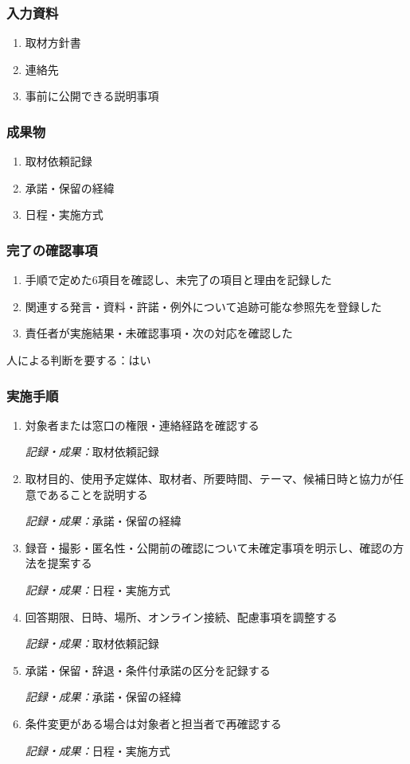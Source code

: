 \documentclass[a4paper,11pt]{article}
\begin{document}
\subsubsection*{入力資料}
\begin{enumerate}[leftmargin=2em,itemsep=0.35em]
\item 取材方針書
\item 連絡先
\item 事前に公開できる説明事項
\end{enumerate}
\subsubsection*{成果物}
\begin{enumerate}[leftmargin=2em,itemsep=0.35em]
\item 取材依頼記録
\item 承諾・保留の経緯
\item 日程・実施方式
\end{enumerate}
\subsubsection*{完了の確認事項}
\begin{enumerate}[leftmargin=2em,itemsep=0.35em]
\item 手順で定めた6項目を確認し、未完了の項目と理由を記録した
\item 関連する発言・資料・許諾・例外について追跡可能な参照先を登録した
\item 責任者が実施結果・未確認事項・次の対応を確認した
\end{enumerate}
\par 人による判断を要する：はい\par\medskip
\subsubsection*{実施手順}
\begin{enumerate}[leftmargin=2em,itemsep=0.65em]
\item 対象者または窓口の権限・連絡経路を確認する\par\noindent\textit{記録・成果：}取材依頼記録\nobreak\smallskip
\item 取材目的、使用予定媒体、取材者、所要時間、テーマ、候補日時と協力が任意であることを説明する\par\noindent\textit{記録・成果：}承諾・保留の経緯\nobreak\smallskip
\item 録音・撮影・匿名性・公開前の確認について未確定事項を明示し、確認の方法を提案する\par\noindent\textit{記録・成果：}日程・実施方式\nobreak\smallskip
\item 回答期限、日時、場所、オンライン接続、配慮事項を調整する\par\noindent\textit{記録・成果：}取材依頼記録\nobreak\smallskip
\item 承諾・保留・辞退・条件付承諾の区分を記録する\par\noindent\textit{記録・成果：}承諾・保留の経緯\nobreak\smallskip
\item 条件変更がある場合は対象者と担当者で再確認する\par\noindent\textit{記録・成果：}日程・実施方式\nobreak\smallskip
\end{enumerate}
\end{document}
